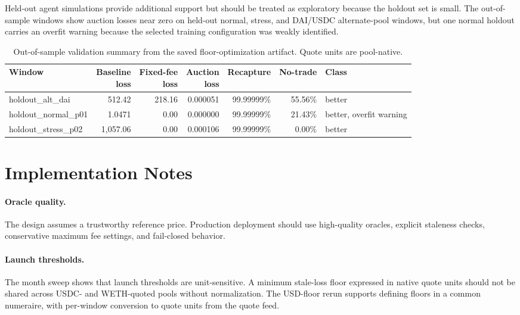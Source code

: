 \documentclass[11pt]{article}
\begin{document}
Held-out agent simulations provide additional support but should be treated as exploratory because the holdout set is small. The out-of-sample windows show auction losses near zero on held-out normal, stress, and DAI/USDC alternate-pool windows, but one normal holdout carries an overfit warning because the selected training configuration was weakly identified.

\begin{table}[t]
\centering
\tiny
\begin{tabular}{@{}l r r r r r l@{}}
\toprule
Window & \shortstack{Baseline\\loss} & \shortstack{Fixed-fee\\loss} & \shortstack{Auction\\loss} & Recapture & No-trade & Class \\
\midrule
holdout\_alt\_dai & 512.42 & 218.16 & 0.000051 & 99.99999\% & 55.56\% & better \\
holdout\_normal\_p01 & 1.0471 & 0.00 & 0.000000 & 99.99999\% & 21.43\% & better, overfit warning \\
holdout\_stress\_p02 & 1{,}057.06 & 0.00 & 0.000106 & 99.99999\% & 0.00\% & better \\
\bottomrule
\end{tabular}
\caption{Out-of-sample validation summary from the saved floor-optimization artifact. Quote units are pool-native.}
\label{tab:oos}
\end{table}

\section{Implementation Notes}

\paragraph{Oracle quality.}
The design assumes a trustworthy reference price. Production deployment should use high-quality oracles, explicit staleness checks, conservative maximum fee settings, and fail-closed behavior.

\paragraph{Launch thresholds.}
The month sweep shows that launch thresholds are unit-sensitive. A minimum stale-loss floor expressed in native quote units should not be shared across USDC- and WETH-quoted pools without normalization. The USD-floor rerun supports defining floors in a common numeraire, with per-window conversion to quote units from the quote feed.
\end{document}
